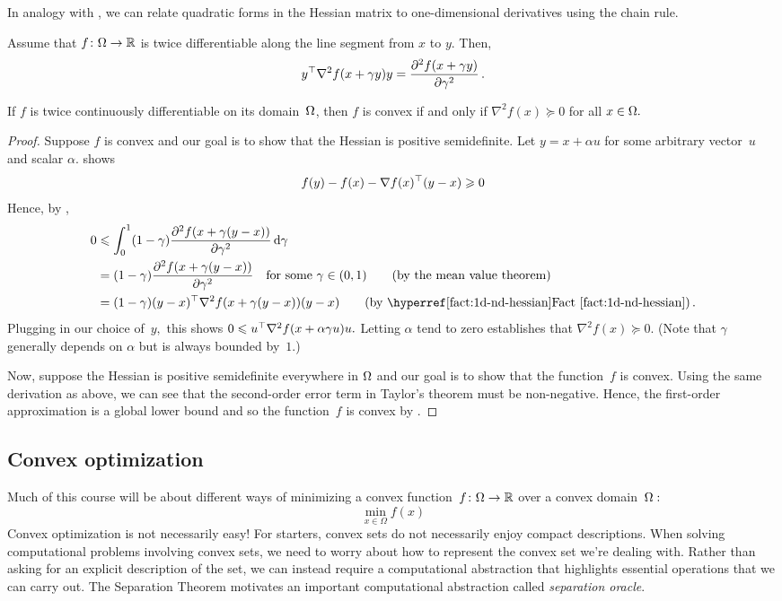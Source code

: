 In analogy with , we can relate quadratic forms in the
Hessian matrix to one-dimensional derivatives using the chain rule.
\begin{fact}
Assume that $f\colon\Omega\to\mathbb{R}$ is twice differentiable along the line segment from $x$ to $y.$ Then,
\[
y^\top \nabla^2f(x+\gamma y)y 
= \frac{\partial^2f(x+\gamma y)}{\partial\gamma^2}\,.
\]
\end{fact}

\begin{proposition}
If $f$ is twice continuously differentiable on its domain~$\Omega$, then $f$ is convex if and only if $\nabla^2 f(x)\succeq 0$ for all $x\in\Omega.$ 
\end{proposition}
\begin{proof}
Suppose $f$ is convex and our goal is to show that the Hessian is positive semidefinite. 
Let $y=x + \alpha u$ for some arbitrary vector~$u$ and scalar $\alpha.$
 shows
\[
f(y) - f(x) -\nabla f(x)^\top (y-x) \geqslant 0
\]
Hence, by ,
\begin{align*}
0&\le  \int_0^1 (1-\gamma)\frac{\partial^2 f(x+\gamma(y-x))}{\partial\gamma^2}\rd\gamma\\
&=  (1-\gamma)\frac{\partial^2 f(x+\gamma(y-x))}{\partial\gamma^2}
\quad\text{for some $\gamma\in(0,1)$} \tag{by the mean value theorem}\\
&= (1-\gamma)(y-x)^\trans \nabla^2 f(x+\gamma (y-x))(y-x) 
\tag{by \factref{1d-nd-hessian}}\,.
\end{align*}
Plugging in our choice of~$y,$ this shows $0\leqslant u^\top \nabla^2
f(x+\alpha\gamma u)u.$ Letting $\alpha$ tend to zero establishes that $\nabla^2
f(x)\succeq 0.$ (Note that $\gamma$ generally depends on $\alpha$ but is always
bounded by~$1.$)

Now, suppose the Hessian is positive semidefinite everywhere in $\Omega$ and
our goal is to show that  the function~$f$ is convex.  Using the same derivation
as above, we can see that the second-order error term in Taylor's theorem must
be non-negative. Hence, the first-order approximation is
a global lower bound and so the function~$f$ is convex by
.
\end{proof}

\subsection{Convex optimization}
Much of this course will be about different ways of minimizing a convex function~$f\colon\Omega\to\mathbb{R}$ over a convex domain~$\Omega:$ 
\[
\min_{x\in \Omega} f(x)
\]
Convex optimization is not necessarily easy! 
For starters, convex sets do not necessarily enjoy compact descriptions. When solving computational problems involving convex sets, we need to worry about how to represent the convex set we're dealing with. Rather than asking for an explicit description of the set, we can instead require a computational abstraction that highlights essential operations that we can carry out. The Separation Theorem motivates an important computational abstraction called \emph{separation oracle}.

